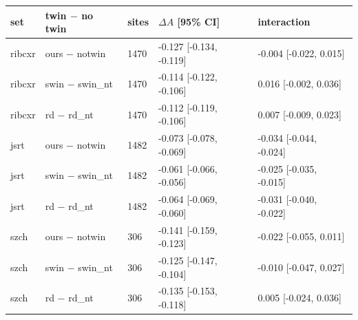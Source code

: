 \begin{tabular}{lllll}
\toprule
set & twin $-$ no twin & sites & $\Delta A$ [95\% CI] & interaction \\
\midrule
ribcxr & ours $-$ notwin & 1470 & -0.127 [-0.134, -0.119] & -0.004 [-0.022, 0.015] \\
ribcxr & swin $-$ swin\_nt & 1470 & -0.114 [-0.122, -0.106] & 0.016 [-0.002, 0.036] \\
ribcxr & rd $-$ rd\_nt & 1470 & -0.112 [-0.119, -0.106] & 0.007 [-0.009, 0.023] \\
jsrt & ours $-$ notwin & 1482 & -0.073 [-0.078, -0.069] & -0.034 [-0.044, -0.024] \\
jsrt & swin $-$ swin\_nt & 1482 & -0.061 [-0.066, -0.056] & -0.025 [-0.035, -0.015] \\
jsrt & rd $-$ rd\_nt & 1482 & -0.064 [-0.069, -0.060] & -0.031 [-0.040, -0.022] \\
szch & ours $-$ notwin & 306 & -0.141 [-0.159, -0.123] & -0.022 [-0.055, 0.011] \\
szch & swin $-$ swin\_nt & 306 & -0.125 [-0.147, -0.104] & -0.010 [-0.047, 0.027] \\
szch & rd $-$ rd\_nt & 306 & -0.135 [-0.153, -0.118] & 0.005 [-0.024, 0.036] \\
\bottomrule
\end{tabular}
